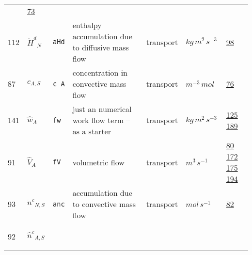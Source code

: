 \begin{longtable}{|p{1cm}|p{2.5cm}|p{4.5cm}|p{8cm}|p{3.0cm}|p{3cm}|p{1cm}|}
             &                 \hyperlink{"e:73"}{ 73 }
                 \\
            112
             & \hypertarget{"v:112"}{ $ {{\dot{H}^d}}{_{N}} $}
             & \verb|aHd|
             & enthalpy accumulation due to diffusive mass flow
             & \begin{lay}transport \end{lay}
             & $ kg \,m^{2} \,s^{-3} \, $
             &                 \hyperlink{"e:98"}{ 98 }
                 \\
            87
             & \hypertarget{"v:87"}{ $ {c}{_{A, S}} $}
             & \verb|c_A|
             & concentration in convective mass flow
             & \begin{lay}transport \end{lay}
             & $ m^{-3} \,mol \, $
             &                 \hyperlink{"e:76"}{ 76 }
                 \\
            141
             & \hypertarget{"v:141"}{ $ {{\hat{w}}}{_{A}} $}
             & \verb|fw|
             & just an numerical work flow term -- as a starter
             & \begin{lay}transport \end{lay}
             & $ kg \,m^{2} \,s^{-3} \, $
             &                 \hyperlink{"e:125"}{ 125 }
                                 \hyperlink{"e:189"}{ 189 }
                 \\
            91
             & \hypertarget{"v:91"}{ $ {{\hat{V}}}{_{A}} $}
             & \verb|fV|
             & volumetric flow
             & \begin{lay}transport \end{lay}
             & $ m^{3} \,s^{-1} \, $
             &                 \hyperlink{"e:80"}{ 80 }
                                 \hyperlink{"e:172"}{ 172 }
                                 \hyperlink{"e:175"}{ 175 }
                                 \hyperlink{"e:194"}{ 194 }
                 \\
            93
             & \hypertarget{"v:93"}{ $ {{\dot{n}^c}}{_{N, S}} $}
             & \verb|anc|
             & accumulation due to convective mass flow
             & \begin{lay}transport \end{lay}
             & $ mol \,s^{-1} \, $
             &                 \hyperlink{"e:82"}{ 82 }
                 \\
            92
             & \hypertarget{"v:92"}{ $ {{\hat{n}^c}}{_{A, S}} $}

\end{longtable}
